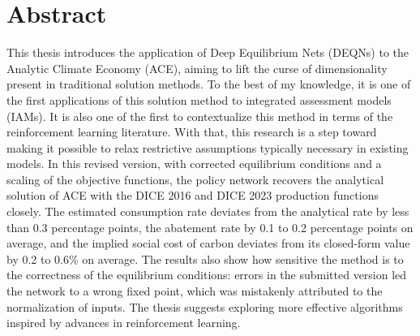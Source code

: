 \section*{Abstract}

This thesis introduces the application of Deep Equilibrium Nets (DEQNs) to the Analytic Climate Economy (ACE), aiming to lift the curse of dimensionality present in traditional solution methods. To the best of my knowledge, it is one of the first applications of this solution method to integrated assessment models (IAMs). It is also one of the first to contextualize this method in terms of the reinforcement learning literature. With that, this research is a step toward making it possible to relax restrictive assumptions typically necessary in existing models. In this revised version, with corrected equilibrium conditions and a scaling of the objective functions, the policy network recovers the analytical solution of ACE with the DICE 2016 and DICE 2023 production functions closely. The estimated consumption rate deviates from the analytical rate by less than 0.3 percentage points, the abatement rate by 0.1 to 0.2 percentage points on average, and the implied social cost of carbon deviates from its closed-form value by 0.2 to 0.6\% on average. The results also show how sensitive the method is to the correctness of the equilibrium conditions: errors in the submitted version led the network to a wrong fixed point, which was mistakenly attributed to the normalization of inputs. The thesis suggests exploring more effective algorithms inspired by advances in reinforcement learning.